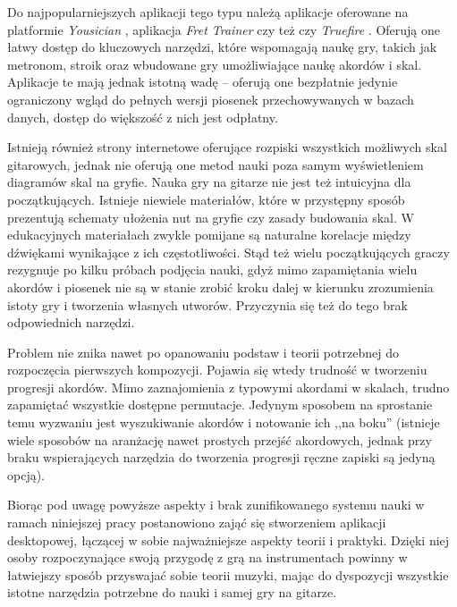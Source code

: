 Do najpopularniejszych aplikacji tego typu należą aplikacje oferowane na platformie \emph{Yousician} \cite{Yousician}, aplikacja \emph{Fret Trainer} \cite{FretMaster} czy też czy \emph{Truefire} \cite{TrueFire}. %
Oferują one łatwy dostęp do kluczowych narzędzi, które wspomagają naukę gry, takich jak metronom, stroik oraz wbudowane gry umożliwiające naukę akordów i skal. Aplikacje te mają jednak istotną wadę -- oferują one bezpłatnie jedynie ograniczony wgląd do pełnych wersji piosenek przechowywanych w bazach danych, dostęp do większość z nich jest odpłatny.

Istnieją również strony internetowe oferujące rozpiski wszystkich możliwych skal gitarowych, jednak nie oferują one metod nauki poza samym wyświetleniem diagramów skal na gryfie. Nauka gry na gitarze nie jest też intuicyjna dla początkujących. Istnieje niewiele materiałów, które w przystępny sposób prezentują schematy ułożenia nut na gryfie czy zasady budowania skal. W edukacyjnych materiałach zwykle pomijane są naturalne korelacje między dźwiękami wynikające z ich częstotliwości. Stąd też wielu początkujących graczy rezygnuje po kilku próbach podjęcia nauki, gdyż mimo zapamiętania wielu akordów i piosenek nie są w stanie zrobić kroku dalej w kierunku zrozumienia istoty gry i tworzenia własnych utworów. Przyczynia się też do tego brak odpowiednich narzędzi.

Problem nie znika nawet po opanowaniu podstaw i teorii potrzebnej do rozpoczęcia pierwszych kompozycji. Pojawia się wtedy trudność w tworzeniu progresji akordów. Mimo zaznajomienia z typowymi akordami w skalach, trudno zapamiętać wszystkie dostępne permutacje. Jedynym sposobem na sprostanie temu wyzwaniu jest wyszukiwanie akordów i notowanie ich ,,na boku'' (istnieje wiele sposobów na aranżację nawet prostych przejść akordowych, jednak przy braku wspierających narzędzia do tworzenia progresji ręczne zapiski są jedyną opcją).

Biorąc pod uwagę powyższe aspekty i brak zunifikowanego systemu nauki w ramach niniejszej pracy postanowiono zająć się stworzeniem aplikacji desktopowej, łączącej w sobie najważniejsze aspekty teorii i praktyki. Dzięki niej osoby rozpoczynające swoją przygodę z grą na instrumentach powinny w łatwiejszy sposób przyswajać sobie teorii muzyki, mając do dyspozycji wszystkie istotne narzędzia potrzebne do nauki i samej gry na gitarze.

